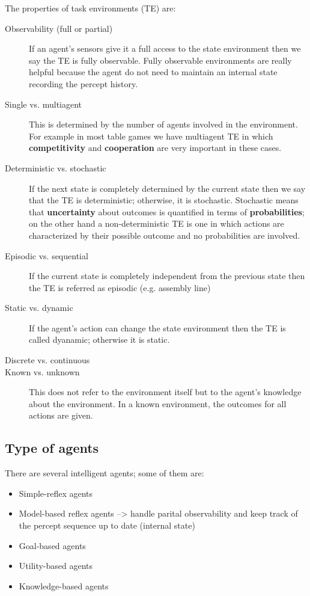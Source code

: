 \documentclass[a4paper, 11pt]{article}
\begin{document}
The properties of task environments (TE) are:
\begin{description}
  \item[Observability (full or partial)]
    If an agent's sensors give it a full access to the state environment then we say the TE is fully observable. Fully observable environments are really helpful
    because the agent do not need to maintain an internal state recording the percept history.
  \item[Single vs. multiagent]
    This is determined by the number of agents involved in the environment. For example in most table games we have multiagent TE in which \textbf{competitivity} and \textbf{cooperation} are very important in these cases.
  \item[Deterministic vs. stochastic]
    If the next state is completely determined by the current state then we say that the TE is deterministic; otherwise, it is stochastic.
    Stochastic means that \textbf{uncertainty} about outcomes is quantified in terms of \textbf{probabilities}; on the other hand a non-deterministic TE is one in which actions are characterized by their possible outcome and no probabilities are involved.
  \item[Episodic vs. sequential]
    If the current state is completely independent from the previous state then the TE is referred as episodic (e.g. assembly line)
  \item[Static vs. dynamic]
    If the agent's action can change the state environment then the TE is called dyanamic; otherwise it is static.
  \item[Discrete vs. continuous]
  \item[Known vs. unknown]
    This does not refer to the environment itself but to the agent's knowledge about the environment. In a known environment, the outcomes for all actions are given.
\end{description}

\subsection*{Type of agents}
There are several intelligent agents; some of them are:
\begin{itemize}
  \item Simple-reflex agents
  \item Model-based reflex agents --> handle parital observability and keep track of the percept sequence up to date (internal state)
  \item Goal-based agents
  \item Utility-based agents
  \item Knowledge-based agents
\end{itemize}
\end{document}
